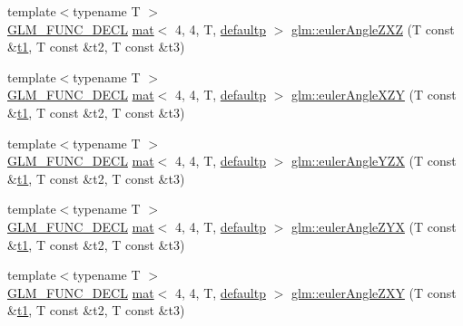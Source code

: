 \begin{DoxyCompactItemize}
\item 
{\footnotesize template$<$typename T $>$ }\\\mbox{\hyperlink{setup_8hpp_ab2d052de21a70539923e9bcbf6e83a51}{G\+L\+M\+\_\+\+F\+U\+N\+C\+\_\+\+D\+E\+CL}} \mbox{\hyperlink{structglm_1_1mat}{mat}}$<$ 4, 4, T, \mbox{\hyperlink{namespaceglm_a36ed105b07c7746804d7fdc7cc90ff25a9d21ccd8b5a009ec7eb7677befc3bf51}{defaultp}} $>$ \mbox{\hyperlink{group__gtx__euler__angles_ga178f966c52b01e4d65e31ebd007e3247}{glm\+::euler\+Angle\+Z\+XZ}} (T const \&\mbox{\hyperlink{_s_d_l__opengl__glext_8h_af48031a37b713afa3b0d0d7d29653d7c}{t1}}, T const \&t2, T const \&t3)
\item 
{\footnotesize template$<$typename T $>$ }\\\mbox{\hyperlink{setup_8hpp_ab2d052de21a70539923e9bcbf6e83a51}{G\+L\+M\+\_\+\+F\+U\+N\+C\+\_\+\+D\+E\+CL}} \mbox{\hyperlink{structglm_1_1mat}{mat}}$<$ 4, 4, T, \mbox{\hyperlink{namespaceglm_a36ed105b07c7746804d7fdc7cc90ff25a9d21ccd8b5a009ec7eb7677befc3bf51}{defaultp}} $>$ \mbox{\hyperlink{group__gtx__euler__angles_ga996dce12a60d8a674ba6737a535fa910}{glm\+::euler\+Angle\+X\+ZY}} (T const \&\mbox{\hyperlink{_s_d_l__opengl__glext_8h_af48031a37b713afa3b0d0d7d29653d7c}{t1}}, T const \&t2, T const \&t3)
\item 
{\footnotesize template$<$typename T $>$ }\\\mbox{\hyperlink{setup_8hpp_ab2d052de21a70539923e9bcbf6e83a51}{G\+L\+M\+\_\+\+F\+U\+N\+C\+\_\+\+D\+E\+CL}} \mbox{\hyperlink{structglm_1_1mat}{mat}}$<$ 4, 4, T, \mbox{\hyperlink{namespaceglm_a36ed105b07c7746804d7fdc7cc90ff25a9d21ccd8b5a009ec7eb7677befc3bf51}{defaultp}} $>$ \mbox{\hyperlink{group__gtx__euler__angles_ga08bef16357b8f9b3051b3dcaec4b7848}{glm\+::euler\+Angle\+Y\+ZX}} (T const \&\mbox{\hyperlink{_s_d_l__opengl__glext_8h_af48031a37b713afa3b0d0d7d29653d7c}{t1}}, T const \&t2, T const \&t3)
\item 
{\footnotesize template$<$typename T $>$ }\\\mbox{\hyperlink{setup_8hpp_ab2d052de21a70539923e9bcbf6e83a51}{G\+L\+M\+\_\+\+F\+U\+N\+C\+\_\+\+D\+E\+CL}} \mbox{\hyperlink{structglm_1_1mat}{mat}}$<$ 4, 4, T, \mbox{\hyperlink{namespaceglm_a36ed105b07c7746804d7fdc7cc90ff25a9d21ccd8b5a009ec7eb7677befc3bf51}{defaultp}} $>$ \mbox{\hyperlink{group__gtx__euler__angles_ga2e61f1e39069c47530acab9167852dd6}{glm\+::euler\+Angle\+Z\+YX}} (T const \&\mbox{\hyperlink{_s_d_l__opengl__glext_8h_af48031a37b713afa3b0d0d7d29653d7c}{t1}}, T const \&t2, T const \&t3)
\item 
{\footnotesize template$<$typename T $>$ }\\\mbox{\hyperlink{setup_8hpp_ab2d052de21a70539923e9bcbf6e83a51}{G\+L\+M\+\_\+\+F\+U\+N\+C\+\_\+\+D\+E\+CL}} \mbox{\hyperlink{structglm_1_1mat}{mat}}$<$ 4, 4, T, \mbox{\hyperlink{namespaceglm_a36ed105b07c7746804d7fdc7cc90ff25a9d21ccd8b5a009ec7eb7677befc3bf51}{defaultp}} $>$ \mbox{\hyperlink{group__gtx__euler__angles_gab4505c54d2dd654df4569fd1f04c43aa}{glm\+::euler\+Angle\+Z\+XY}} (T const \&\mbox{\hyperlink{_s_d_l__opengl__glext_8h_af48031a37b713afa3b0d0d7d29653d7c}{t1}}, T const \&t2, T const \&t3)

\end{DoxyCompactItemize}
